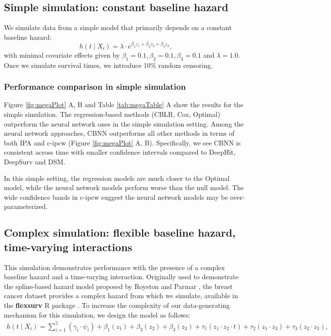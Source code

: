 \documentclass[AMA,STIX1COL,]{WileyNJD-v2}
\begin{document}
\hypertarget{simple-simulation-constant-baseline-hazard}{%
\subsection{Simple simulation: constant baseline
hazard}\label{simple-simulation-constant-baseline-hazard}}

We simulate data from a simple model that primarily depends on a
constant baseline hazard:
\[h(t \mid X_i) = \lambda\cdot e^{\beta_{{1}}z_{1}+\beta_{{2}}z_{2}+\beta_{{3}}z_{3}},\]
with minimal covariate effects given by
\(\beta_{{1}}=0.1, \beta_{{2}}=0.1, \beta_{{3}}=0.1\) and
\(\lambda=1.0\). Once we simulate survival times, we introduce 10\%
random censoring.

\hypertarget{performance-comparison-in-simple-simulation}{%
\subsubsection{Performance comparison in simple
simulation}\label{performance-comparison-in-simple-simulation}}

Figure \ref{fig:megaPlot} A, B and Table \ref{tab:megaTable} A show the
results for the simple simulation. The regression-based methods (CBLR,
Cox, Optimal) outperform the neural network ones in the simple
simulation setting. Among the neural network approaches, CBNN
outperforms all other methods in terms of both IPA and c-ipcw (Figure
\ref{fig:megaPlot} A, B). Specifically, we see CBNN is consistent across
time with smaller confidence intervals compared to DeepHit, DeepSurv and
DSM.

In this simple setting, the regression models are much closer to the
Optimal model, while the neural network models perform worse than the
null model. The wide confidence bands in c-ipcw suggest the neural
network models may be over-parameterized.

\hypertarget{complex-simulation-flexible-baseline-hazard-time-varying-interactions}{%
\subsection{Complex simulation: flexible baseline hazard, time-varying
interactions}\label{complex-simulation-flexible-baseline-hazard-time-varying-interactions}}

This simulation demonstrates performance with the presence of a complex
baseline hazard and a time-varying interaction. Originally used to
demonstrate the spline-based hazard model proposed by Royston and Parmar
\citep{royston2002flexible}, the breast cancer dataset provides a
complex hazard from which we simulate, available in the
\textbf{flexsurv} R package \citep{flexsurv}. To increase the complexity
of our data-generating mechanism for this simulation, we design the
model as follows: \begin{align}
h(t \mid X_i) =\sum_{i=1}^{5} (\gamma_{i} \cdot \psi_{i}) + \beta_{{1}} (z_{1}) + \beta_{{2}} (z_{2})+ \beta_{{3}} (z_{3})+ \tau_{1} ( z_{1} \cdot z_{2} \cdot t)+ \tau_{2} ( z_{1} \cdot z_{3})+ \tau_{3} (z_{2} \cdot z_{3}), \nonumber
\end{align}
\end{document}
